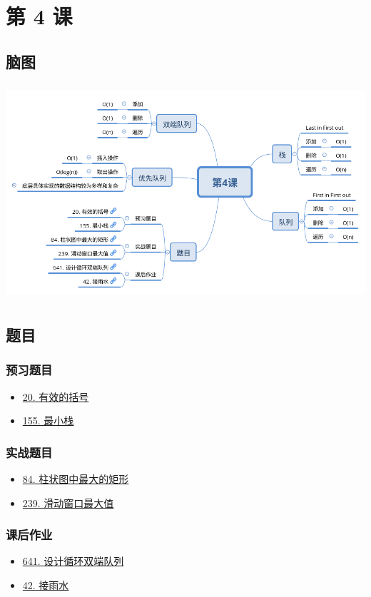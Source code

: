\newpage
\section{第 4 课}

\subsection{脑图}

\includegraphics[width=170mm,height=80mm]{images/第4课.png}

\subsection{题目}

\subsubsection{预习题目}

\begin{itemize}
  \item \hyperref[leetcode:20]{20. 有效的括号}
  \item \hyperref[leetcode:155]{155. 最小栈}
\end{itemize}

\subsubsection{实战题目}

\begin{itemize}
  \item \hyperref[leetcode:84]{84. 柱状图中最大的矩形}
  \item \hyperref[leetcode:239]{239. 滑动窗口最大值}
\end{itemize}

\subsubsection{课后作业}

\begin{itemize}
  \item \hyperref[leetcode:641]{641. 设计循环双端队列}
  \item \hyperref[leetcode:42]{42. 接雨水}
\end{itemize}
